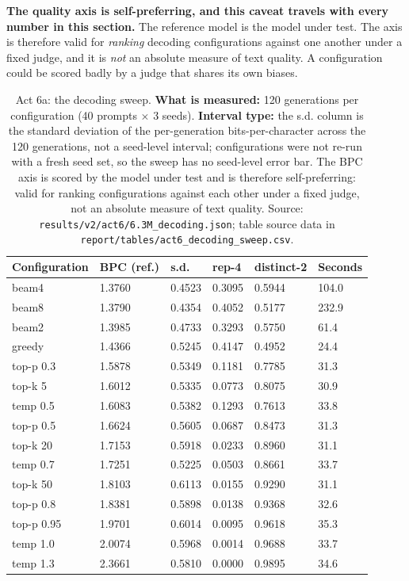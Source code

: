 \documentclass[11pt,a4paper]{article}
\begin{document}
\textbf{The quality axis is self-preferring, and this caveat travels with every
number in this section.} The reference model is the model under test. The axis
is therefore valid for \emph{ranking} decoding configurations against one
another under a fixed judge, and it is \emph{not} an absolute measure of text
quality. A configuration could be scored badly by a judge that shares its own
biases.

\begin{table}[H]
\centering
\begin{tabular}{L{2.8cm}R{2.4cm}R{2.2cm}R{2.2cm}R{2.2cm}R{1.6cm}}
\toprule
Configuration & BPC (ref.) & s.d. & rep-4 & distinct-2 & Seconds \\
\midrule
beam4 & 1.3760 & 0.4523 & 0.3095 & 0.5944 & 104.0 \\
beam8 & 1.3790 & 0.4354 & 0.4052 & 0.5177 & 232.9 \\
beam2 & 1.3985 & 0.4733 & 0.3293 & 0.5750 & 61.4 \\
greedy & 1.4366 & 0.5245 & 0.4147 & 0.4952 & 24.4 \\
top-p 0.3 & 1.5878 & 0.5349 & 0.1181 & 0.7785 & 31.3 \\
top-k 5 & 1.6012 & 0.5335 & 0.0773 & 0.8075 & 30.9 \\
temp 0.5 & 1.6083 & 0.5382 & 0.1293 & 0.7613 & 33.8 \\
top-p 0.5 & 1.6624 & 0.5605 & 0.0687 & 0.8473 & 31.3 \\
top-k 20 & 1.7153 & 0.5918 & 0.0233 & 0.8960 & 31.1 \\
temp 0.7 & 1.7251 & 0.5225 & 0.0503 & 0.8661 & 33.7 \\
top-k 50 & 1.8103 & 0.6113 & 0.0155 & 0.9290 & 31.1 \\
top-p 0.8 & 1.8381 & 0.5898 & 0.0138 & 0.9368 & 32.6 \\
top-p 0.95 & 1.9701 & 0.6014 & 0.0095 & 0.9618 & 35.3 \\
temp 1.0 & 2.0074 & 0.5968 & 0.0014 & 0.9688 & 33.7 \\
temp 1.3 & 2.3661 & 0.5810 & 0.0000 & 0.9895 & 34.6 \\
\bottomrule
\end{tabular}
\caption{Act 6a: the decoding sweep. \textbf{What is measured:} 120
generations per configuration (40 prompts $\times$ 3 seeds). \textbf{Interval
type:} the s.d. column is the standard deviation of the per-generation
bits-per-character across the 120 generations, not a seed-level interval;
configurations were not re-run with a fresh seed set, so the sweep has no
seed-level error bar. The BPC axis is scored by the model under test and is
therefore self-preferring: valid for ranking configurations against each other
under a fixed judge, not an absolute measure of text quality. Source:
\texttt{results/v2/act6/6.3M\_decoding.json}; table source data in
\texttt{report/tables/act6\_decoding\_sweep.csv}.}
\label{tab:act6-sweep}
\end{table}
\end{document}
